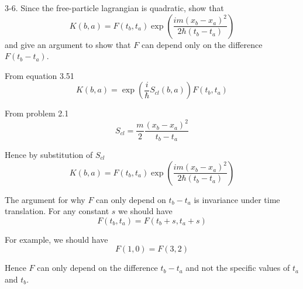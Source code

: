 \documentclass[12pt]{article}
\begin{document}
3-6.
Since the free-particle lagrangian is quadratic, show that
\begin{equation*}
K(b,a)=F(t_b,t_a)\exp\left(\frac{im(x_b-x_a)^2}{2\hbar(t_b-t_a)}\right)
\end{equation*}
and give an argument to show that $F$ can depend only on the difference $F(t_b-t_a)$.

\bigskip
From equation 3.51
\begin{equation*}
K(b,a)=\exp\left(\frac{i}{\hbar}S_{cl}(b,a)\right)F(t_b,t_a)
\end{equation*}

From problem 2.1
\begin{equation*}
S_{cl}=\frac{m}{2}\frac{(x_b-x_a)^2}{t_b-t_a}
\end{equation*}

Hence by substitution of $S_{cl}$
\begin{equation*}
K(b,a)=F(t_b,t_a)\exp\left(\frac{im(x_b-x_a)^2}{2\hbar(t_b-t_a)}\right)
\end{equation*}

The argument for why $F$ can only depend on $t_b-t_a$ is invariance under time translation.
For any constant $s$ we should have
\begin{equation*}
F(t_b,t_a)=F(t_b+s,t_a+s)
\end{equation*}

For example, we should have
\begin{equation*}
F(1,0)=F(3,2)
\end{equation*}

Hence $F$ can only depend on the difference $t_b-t_a$ and not the specific values of $t_a$ and $t_b$.
\end{document}
